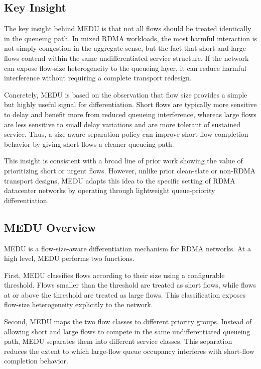 \documentclass[conference]{IEEEtran}
\begin{document}
\subsection{Key Insight}

The key insight behind MEDU is that not all flows should be treated identically in the queueing path. In mixed RDMA workloads, the most harmful interaction is not simply congestion in the aggregate sense, but the fact that short and large flows contend within the same undifferentiated service structure. If the network can expose flow-size heterogeneity to the queueing layer, it can reduce harmful interference without requiring a complete transport redesign.

Concretely, MEDU is based on the observation that flow size provides a simple but highly useful signal for differentiation. Short flows are typically more sensitive to delay and benefit more from reduced queueing interference, whereas large flows are less sensitive to small delay variations and are more tolerant of sustained service. Thus, a size-aware separation policy can improve short-flow completion behavior by giving short flows a cleaner queueing path.

This insight is consistent with a broad line of prior work showing the value of prioritizing short or urgent flows. However, unlike prior clean-slate or non-RDMA transport designs, MEDU adapts this idea to the specific setting of RDMA datacenter networks by operating through lightweight queue-priority differentiation.

\subsection{MEDU Overview}

MEDU is a flow-size-aware differentiation mechanism for RDMA networks. At a high level, MEDU performs two functions.

First, MEDU classifies flows according to their size using a configurable threshold. Flows smaller than the threshold are treated as short flows, while flows at or above the threshold are treated as large flows. This classification exposes flow-size heterogeneity explicitly to the network.

Second, MEDU maps the two flow classes to different priority groups. Instead of allowing short and large flows to compete in the same undifferentiated queueing path, MEDU separates them into different service classes. This separation reduces the extent to which large-flow queue occupancy interferes with short-flow completion behavior.
\end{document}
